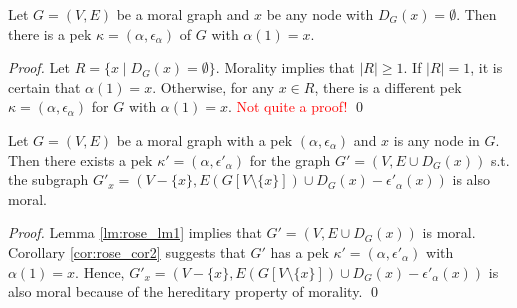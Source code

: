 \begin{corollary} 
\label{cor:rose_cor2}
Let $G=(V,E)$ be a moral graph and $x$ be any node with $D_G(x)=\emptyset$. Then there is a pek $\kappa=(\alpha,\epsilon_{\alpha})$ of $G$ with $\alpha(1) = x$.
\end{corollary}
\begin{proof}
Let $R=\{x \mid D_G(x)=\emptyset\}$. Morality implies that $|R|\ge 1$. If $|R|=1$, it is certain that $\alpha(1)=x$. Otherwise, for any $x\in R$, there is a different pek $\kappa=(\alpha,\epsilon_{\alpha})$ for $G$ with $\alpha(1)=x$.  \textcolor{red}{Not quite a proof!} \qed
\end{proof}

\begin{corollary}
\label{cor:rose_cor1}
Let $G=(V,E)$ be a moral graph with a pek $(\alpha, \epsilon_{\alpha})$ and $x$ is any node in $G$. Then there exists a pek $\kappa'=(\alpha,\epsilon'_{\alpha})$ for the graph $G'=(V,E\cup D_G(x))$ s.t. the subgraph $G'_x = (V-\{x\},E(G[V\setminus \{x\}])\cup D_G(x)-\epsilon'_{\alpha}(x))$ is also moral. 
\end{corollary}
\begin{proof}
Lemma \ref{lm:rose_lm1} implies that $G'=(V,E\cup D_G(x))$ is moral. Corollary \ref{cor:rose_cor2} suggests that $G'$ has a pek $\kappa'=(\alpha,\epsilon'_{\alpha})$ with $\alpha(1)=x$. Hence, $G'_x = (V-\{x\},E(G[V\setminus \{x\}])\cup D_G(x)-\epsilon'_{\alpha}(x))$ is also moral because of the hereditary property of morality. \qed
\end{proof}

